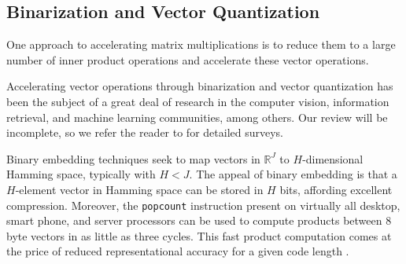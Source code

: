 

\subsection{Binarization and Vector Quantization}

One approach to accelerating matrix multiplications is to reduce them to a large number of inner product operations and accelerate these vector operations.

Accelerating vector operations through binarization and vector quantization has been the subject of a great deal of research in the computer vision, information retrieval, and machine learning communities, among others. Our review will be incomplete, so we refer the reader to \cite{learningToHashSurvey, hashingSimilaritySurvey} for detailed surveys.

Binary embedding techniques seek to map vectors in $\mathbb{R}^J$ to $H$-dimensional Hamming space, typically with $H < J$. The appeal of binary embedding is that a $H$-element vector in Hamming space can be stored in $H$ bits, affording excellent compression. Moreover, the \texttt{popcount} instruction present on virtually all desktop, smart phone, and server processors can be used to compute products between 8 byte vectors in as little as three cycles. This fast product computation comes at the price of reduced representational accuracy for a given code length \cite{opq,hashingSimilaritySurvey}. %

